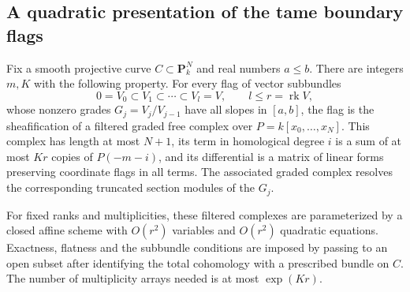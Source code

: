 \subsection{A quadratic presentation of the tame boundary flags}

\begin{lemma}
\label{D:filtered-linear-curve-resolution}
Fix a smooth projective curve $C\subset\mathbf P^N_k$ and real numbers
$a\le b$.  There are integers $m,K$ with the following property.
For every flag of vector subbundles
\[
        0=V_0\subset V_1\subset\cdots\subset V_l=V,
            \qquad l\le r=\operatorname{rk}V,
\]
whose nonzero grades $G_j=V_j/V_{j-1}$ have all slopes in $[a,b]$,
the flag is the sheafification of a filtered graded free complex
over $P=k[x_0,\ldots,x_N]$.  This complex has length at most $N+1$,
its term in homological degree $i$ is a sum of at most $Kr$
copies of $P(-m-i)$, and its differential is a matrix of linear
forms preserving coordinate flags in all terms.  The associated
graded complex resolves the corresponding truncated section
modules of the $G_j$.

For fixed ranks and multiplicities, these filtered complexes are
parameterized by a closed affine scheme with $O(r^2)$ variables
and $O(r^2)$ quadratic equations.  Exactness, flatness and the
subbundle conditions are imposed by passing to an open subset
after identifying the total cohomology with a prescribed bundle
on $C$.  The number of multiplicity arrays needed is at most
$\exp(Kr)$.
\end{lemma}

